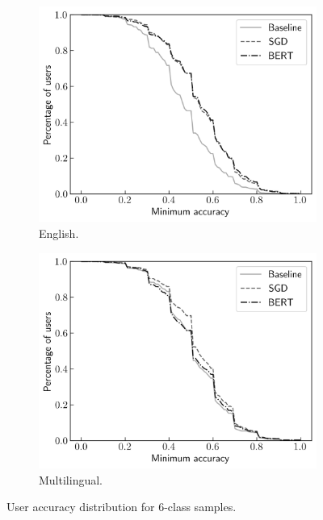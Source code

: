 \begin{figure}[ht]
    \centering
    \begin{subfigure}[ht]{0.49\textwidth}
        \centering
        \includegraphics[width=\textwidth]{figures/06_results/02_pu/02_simple/eng_6.png}
        \caption{English.}
        \label{fig:Res_PU_Simp_E6}
    \end{subfigure}
    \hfill
    \begin{subfigure}[ht]{0.49\textwidth}
        \centering
        \includegraphics[width=\textwidth]{figures/06_results/02_pu/02_simple/any_6.png}
        \caption{Multilingual.}
        \label{fig:Res_PU_Simp_M6}
    \end{subfigure}
    \caption{User accuracy distribution for 6-class samples.}
    \label{fig:Res_PU_Simp_6}
\end{figure}

